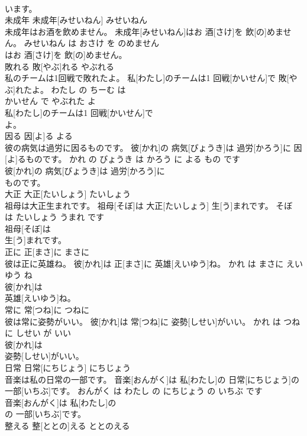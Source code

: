 \documentclass[8pt]{extreport}
\begin{document}
\begin{CJK}{UTF8}{min}
\\	います。			
\\	未成年	未成年[みせいねん]	みせいねん	
\\	未成年はお酒を飲めません。	未成年[みせいねん]はお 酒[さけ]を 飲[の]めません。	みせいねん は おさけ を のめません	
\\	はお 酒[さけ]を 飲[の]めません。			
\\	敗れる	敗[やぶ]れる	やぶれる	
\\	私のチームは1回戦で敗れたよ。	私[わたし]のチームは1 回戦[かいせん]で 敗[やぶ]れたよ。	わたし の ちーむ は 
\\	かいせん で やぶれた よ	
\\	私[わたし]のチームは1 回戦[かいせん]で
\\	よ。			
\\	因る	因[よ]る	よる	
\\	彼の病気は過労に因るものです。	彼[かれ]の 病気[びょうき]は 過労[かろう]に 因[よ]るものです。	かれ の びょうき は かろう に よる もの です	
\\	彼[かれ]の 病気[びょうき]は 過労[かろう]に
\\	ものです。			
\\	大正	大正[たいしょう]	たいしょう	
\\	祖母は大正生まれです。	祖母[そぼ]は 大正[たいしょう] 生[う]まれです。	そぼ は たいしょう うまれ です	
\\	祖母[そぼ]は
\\	生[う]まれです。			
\\	正に	正[まさ]に	まさに	
\\	彼は正に英雄ね。	彼[かれ]は 正[まさ]に 英雄[えいゆう]ね。	かれ は まさに えいゆう ね	
\\	彼[かれ]は
\\	英雄[えいゆう]ね。			
\\	常に	常[つね]に	つねに	
\\	彼は常に姿勢がいい。	彼[かれ]は 常[つね]に 姿勢[しせい]がいい。	かれ は つねに しせい が いい	
\\	彼[かれ]は
\\	姿勢[しせい]がいい。			
\\	日常	日常[にちじょう]	にちじょう	
\\	音楽は私の日常の一部です。	音楽[おんがく]は 私[わたし]の 日常[にちじょう]の 一部[いちぶ]です。	おんがく は わたし の にちじょう の いちぶ です	
\\	音楽[おんがく]は 私[わたし]の
\\	の 一部[いちぶ]です。			
\\	整える	整[ととの]える	ととのえる	

\end{CJK}
\end{document}
